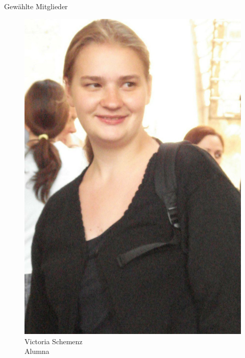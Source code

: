 \documentclass[compress, aspectratio=169]{beamer}
\begin{document}
\begin{frame}{Gewählte Mitglieder}
\begin{minipage}{.28\textwidth}
  \end{minipage}
  \hspace{0.1\textwidth}
  \begin{minipage}{.28\textwidth}
    \begin{figure}
      \begin{minipage}[r]{.57\textwidth}
        \includegraphics[height=0.3\textheight]{vicky.jpg}
      \end{minipage} \hfill
      \begin{minipage}[l]{.4\textwidth}
        \caption*{Victoria Schemenz \\Alumna}
      \end{minipage}
    \end{figure}
  \end{minipage}
  \hspace{0.1\textwidth}

\end{frame}
\end{document}
